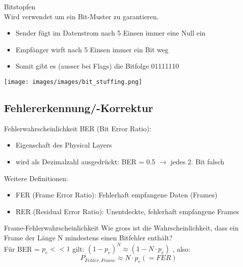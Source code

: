 \begin{concept}{Bitstopfen}\\
    Wird verwendet um ein Bit-Muster zu garantieren.
    \begin{itemize}
        \item Sender fügt im Datenstrom nach 5 Einsen immer eine Null ein
        \item Empfänger wirft nach 5 Einsen immer ein Bit weg
        \item Somit gibt es (ausser bei Flags) die Bitfolge 01111110
    \end{itemize}
        \texttt{[image: images/images/bit\_stuffing.png]}
\end{concept}

\subsection{Fehlererkennung/-Korrektur}

\begin{definition}{Fehlerwahrscheinlichkeit}
    BER (Bit Error Ratio):
    \begin{itemize}
        \item Eigenschaft des Physical Layers
        \item wird als Dezimalzahl ausgedrückt: BER = 0.5 $\rightarrow$ jedes 2. Bit falsch
    \end{itemize}
    Weitere Definitionen:
    \begin{itemize}
        \item FER (Frame Error Ratio): Fehlerhaft empfangene Daten (Frames)
        \item RER (Residual Error Ratio): Unentdeckte, fehlerhaft empfangene Frames
    \end{itemize}
\end{definition}

\begin{KR}{Frame-Fehlerwahrscheinlichkeit}
    Wie gross ist die Wahrscheinlichkeit, dass ein Frame der Länge N mindestens einen Bitfehler enthält?\\
    Für BER = $p_e << 1$ gilt: $(1 - p_e)^N \approx (1 - N \cdot p_e)$ , also: 
    $$P_{Fehler, Frame} \approx N \cdot p_e (=FER)$$
\end{KR}

